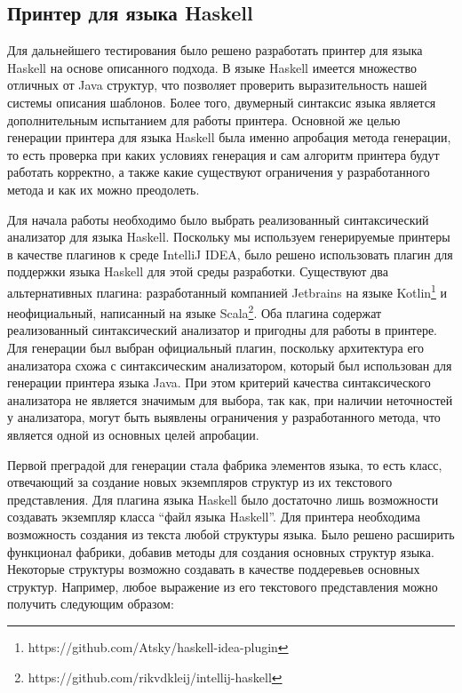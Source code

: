 \documentclass{matmex-diploma}
\begin{document}
\subsection{Принтер для языка Haskell}

Для дальнейшего тестирования было решено разработать принтер для языка Haskell на основе описанного подхода. В языке Haskell имеется множество отличных от Java структур, что позволяет проверить выразительность нашей системы описания шаблонов. Более того, двумерный синтаксис языка является дополнительным испытанием для работы принтера. Основной же целью генерации принтера для языка Haskell была именно апробация метода генерации, то есть проверка при каких условиях генерация и сам алгоритм принтера будут работать корректно, а также какие существуют ограничения у разработанного метода и как их можно преодолеть. 

Для начала работы необходимо было выбрать реализованный синтаксический анализатор для языка Haskell. Поскольку мы используем генерируемые принтеры в качестве плагинов к среде IntelliJ IDEA, было решено использовать плагин для поддержки языка Haskell для этой среды разработки. Существуют два альтернативных плагина: разработанный компанией Jetbrains на языке Kotlin\footnote{https://github.com/Atsky/haskell-idea-plugin} и неофициальный, написанный на языке Scala\footnote{https://github.com/rikvdkleij/intellij-haskell}. Оба плагина содержат реализованный синтаксический анализатор и пригодны для работы в принтере. Для генерации был выбран официальный плагин, поскольку архитектура его анализатора схожа с синтаксическим анализатором, который был использован для генерации принтера языка Java. При этом критерий качества синтаксического анализатора не является значимым для выбора, так как, при наличии неточностей у анализатора, могут быть выявлены ограничения у разработанного метода, что является одной из основных целей апробации. 

Первой преградой для генерации стала фабрика элементов языка, то есть класс, отвечающий за создание новых экземпляров структур из их текстового представления. Для плагина языка Haskell было достаточно лишь возможности создавать экземпляр класса “файл языка Haskell”. Для принтера необходима возможность создания из текста любой структуры языка. Было решено расширить функционал фабрики, добавив методы для создания основных структур языка. Некоторые структуры возможно создавать в качестве поддеревьев основных структур. Например, любое выражение из его текстового представления можно получить следующим образом:
\end{document}
